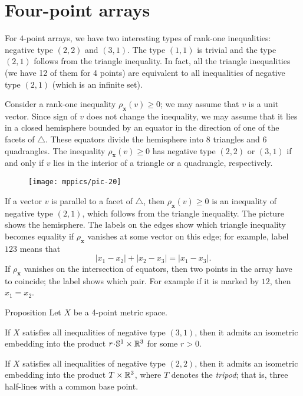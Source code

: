 \documentclass[a4paper,10pt]{article}
\begin{document}
\section{Four-point arrays}\label{Four-point arrays}

For $4$-point arrays, we have two interesting types of rank-one inequalities: negative type $(2,2)$ and $(3,1)$.
The type $(1,1)$ is trivial and
the type $(2,1)$ follows from the triangle inequality.
In fact, all the triangle inequalities (we have 12 of them for 4 points) are equivalent to all inequalities of negative type $(2,1)$ (which is an infinite set).

Consider a rank-one inequality $\rho_{\bm{x}}(v)\ge 0$; we may assume that $v$ is a unit vector.
Since sign of $v$ does not change the inequality, we may assume that it lies in a closed hemisphere bounded by an equator in the direction of one of the facets of $\triangle$.
These equators divide the hemisphere into 8 triangles and 6 quadrangles.
The inequality $\rho_{\bm{x}}(v)\ge 0$ has negative type $(2,2)$ or $(3,1)$
if and only if $v$ lies in the interior of a triangle or a quadrangle, respectively.

\begin{wrapfigure}{o}{36mm}
\centering
\vskip-0mm
\texttt{[image: mppics/pic-20]}
\vskip-0mm
\end{wrapfigure}


If a vector $v$ is parallel to a facet of $\triangle$, then $\rho_{\bm{x}}(v)\ge 0$ is an inequality of negative type $(2,1)$, which follows from the triangle inequality.
The picture shows the hemisphere.
The labels on the edges show which triangle inequality becomes equality if $\rho_{\bm{x}}$ vanishes at some vector on this edge;
for example, label $123$ means that
\[|x_1-x_2|+|x_2-x_3|=|x_1-x_3|.\]
If $\rho_{\bm{x}}$ vanishes on the intersection of equators, then two points in the array have to coincide;
the label shows which pair.
For example if it is marked by $12$, then $x_1=x_2$.

\begin{thm}{Proposition}\label{prop:Four-point arrays}
Let $X$ be a 4-point metric space.

If $X$ satisfies all inequalities of negative type $(3, 1)$, then it admits an isometric embedding into the product $r\cdot \mathbb{S}^1\times\RR^3$ for some $r>0$.

If $X$ satisfies all inequalities of negative type $(2, 2)$, then it admits an isometric embedding into the product $T\times\mathbb{R}^3$, where $T$ denotes the \emph{tripod};
that is, three half-lines with a common base point.
\end{thm}
\end{document}
